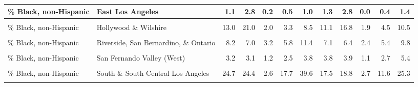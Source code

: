 \begin{table}[!h]
\begin{tabular}[t]{l|>{}l||r|r|r|r|r|r|r|r|r|r}
\hline
\% Black, non-Hispanic & East Los Angeles & 1.1 & 2.8 & 0.2 & 0.5 & 1.0 & 1.3 & 2.8 & 0.0 & 0.4 & 1.4\\
\hline
\cellcolor{gray!6}{\% Black, non-Hispanic} & \cellcolor{gray!6}{Glendale and Pasadena} & \cellcolor{gray!6}{4.4} & \cellcolor{gray!6}{8.5} & \cellcolor{gray!6}{0.8} & \cellcolor{gray!6}{1.7} & \cellcolor{gray!6}{3.2} & \cellcolor{gray!6}{3.4} & \cellcolor{gray!6}{5.2} & \cellcolor{gray!6}{0.5} & \cellcolor{gray!6}{1.8} & \cellcolor{gray!6}{4.1}\\
\hline
\% Black, non-Hispanic & Hollywood \& Wilshire & 13.0 & 21.0 & 2.0 & 3.3 & 8.5 & 11.1 & 16.8 & 1.9 & 4.5 & 10.5\\
\hline
\cellcolor{gray!6}{\% Black, non-Hispanic} & \cellcolor{gray!6}{Long Beach} & \cellcolor{gray!6}{13.1} & \cellcolor{gray!6}{14.4} & \cellcolor{gray!6}{3.0} & \cellcolor{gray!6}{8.9} & \cellcolor{gray!6}{18.8} & \cellcolor{gray!6}{11.4} & \cellcolor{gray!6}{13.0} & \cellcolor{gray!6}{3.6} & \cellcolor{gray!6}{8.1} & \cellcolor{gray!6}{15.1}\\
\hline
\% Black, non-Hispanic & Riverside, San Bernardino, \& Ontario & 8.2 & 7.0 & 3.2 & 5.8 & 11.4 & 7.1 & 6.4 & 2.4 & 5.4 & 9.8\\
\hline
\cellcolor{gray!6}{\% Black, non-Hispanic} & \cellcolor{gray!6}{San Fernando Valley (East)} & \cellcolor{gray!6}{4.0} & \cellcolor{gray!6}{2.3} & \cellcolor{gray!6}{2.3} & \cellcolor{gray!6}{3.7} & \cellcolor{gray!6}{5.3} & \cellcolor{gray!6}{4.3} & \cellcolor{gray!6}{3.8} & \cellcolor{gray!6}{1.6} & \cellcolor{gray!6}{3.3} & \cellcolor{gray!6}{5.7}\\
\hline
\% Black, non-Hispanic & San Fernando Valley (West) & 3.2 & 3.1 & 1.2 & 2.5 & 3.8 & 3.8 & 3.9 & 1.1 & 2.7 & 5.4\\
\hline
\cellcolor{gray!6}{\% Black, non-Hispanic} & \cellcolor{gray!6}{Santa Ana} & \cellcolor{gray!6}{1.2} & \cellcolor{gray!6}{1.8} & \cellcolor{gray!6}{0.6} & \cellcolor{gray!6}{0.9} & \cellcolor{gray!6}{1.4} & \cellcolor{gray!6}{1.3} & \cellcolor{gray!6}{1.9} & \cellcolor{gray!6}{0.1} & \cellcolor{gray!6}{0.7} & \cellcolor{gray!6}{1.6}\\
\hline
\% Black, non-Hispanic & South \& South Central Los Angeles & 24.7 & 24.4 & 2.6 & 17.7 & 39.6 & 17.5 & 18.8 & 2.7 & 11.6 & 25.3\\
\hline
\cellcolor{gray!6}{\% Black, non-Hispanic} & \cellcolor{gray!6}{South Bay} & \cellcolor{gray!6}{13.2} & \cellcolor{gray!6}{20.2} & \cellcolor{gray!6}{1.5} & \cellcolor{gray!6}{4.1} & \cellcolor{gray!6}{15.2} & \cellcolor{gray!6}{12.1} & \cellcolor{gray!6}{16.9} & \cellcolor{gray!6}{1.7} & \cellcolor{gray!6}{5.7} & \cellcolor{gray!6}{14.3}\\

\end{tabular}
\end{table}
